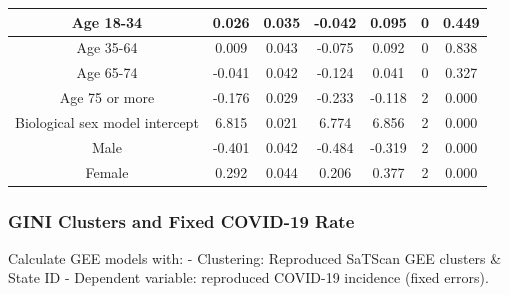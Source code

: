 \documentclass[
]{article}
\begin{document}
\begin{table}
\begin{tabular}[t]{c|c|c|c|c|c|c}
\hline
Age 18-34 & 0.026 & 0.035 & -0.042 & 0.095 & 0 & 0.449\\
\hline
Age 35-64 & 0.009 & 0.043 & -0.075 & 0.092 & 0 & 0.838\\
\hline
Age 65-74 & -0.041 & 0.042 & -0.124 & 0.041 & 0 & 0.327\\
\hline
Age 75 or more & -0.176 & 0.029 & -0.233 & -0.118 & 2 & 0.000\\
\hline
Biological sex model intercept & 6.815 & 0.021 & 6.774 & 6.856 & 2 & 0.000\\
\hline
Male & -0.401 & 0.042 & -0.484 & -0.319 & 2 & 0.000\\
\hline
Female & 0.292 & 0.044 & 0.206 & 0.377 & 2 & 0.000\\
\hline
\end{tabular}
\end{table}

\hypertarget{gini-clusters-and-fixed-covid-19-rate}{%
\subsubsection{GINI Clusters and Fixed COVID-19
Rate}\label{gini-clusters-and-fixed-covid-19-rate}}

Calculate GEE models with: - Clustering: Reproduced SaTScan GEE clusters
\& State ID - Dependent variable: reproduced COVID-19 incidence (fixed
errors).
\end{document}

